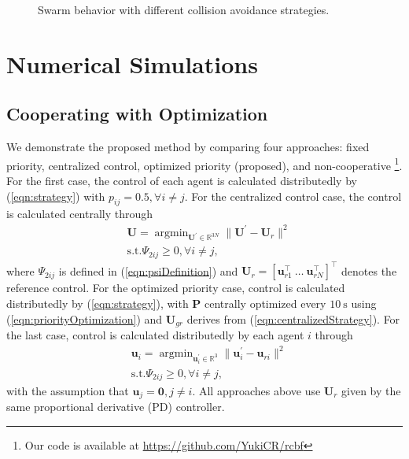 \documentclass{ifacconf}
\begin{document}
\begin{figure}[t!]
   \caption{Swarm behavior with different collision avoidance strategies.}
   \label{fig:optexp}
\end{figure}

\section{Numerical Simulations}\label{sec:exp}

\subsection{Cooperating with Optimization}
\par We demonstrate the proposed method by comparing four approaches: fixed priority, centralized control, optimized priority (proposed), and non-cooperative 
\footnote{Our code is available at \url{https://github.com/YukiCR/rcbf}}.
For the first case, the control of each agent is calculated distributedly by (\ref{eqn:strategy}) with $p_{ij} = 0.5, \forall i \neq j$.
For the centralized control case, the control is calculated centrally through 
\begin{equation}\label{eqn:centralizedStrategy}
\begin{aligned}
      &\boldsymbol{U} = \mathop{\arg \min}_{\boldsymbol{U}^{\prime} \in \mathbb{R}^{3 N}} \| \boldsymbol{U}^\prime - \boldsymbol{U}_r\|^2 \\
      &\mathrm{s.t.}  \Psi_{2ij} \ge 0, \forall i \neq j,
\end{aligned}
\end{equation}
where $\Psi_{2ij}$ is defined in (\ref{eqn:psiDefinition}) and $\boldsymbol{U}_r = [\boldsymbol{u}_{r1}^{\top}~\dots~\boldsymbol{u}_{rN}^{\top}]^\top$ denotes the reference control.
For the optimized priority case, control is calculated distributedly by (\ref{eqn:strategy}), with $\boldsymbol{P}$ centrally optimized every $10~\mathrm{s}$ using (\ref{eqn:priorityOptimization}) and $\boldsymbol{U}_{gr}$ derives from (\ref{eqn:centralizedStrategy}).
For the last case, control is calculated distributedly by each agent $i$ through
\begin{equation}
\begin{aligned}
      & \boldsymbol{u}_i = \mathop{\arg \min}_{\boldsymbol{u}_i^{\prime} \in \mathbb{R}^{3}} \| \boldsymbol{u}_i^\prime - \boldsymbol{u}_{ri}\|^2 \\
      & \mathrm{s.t.}  \Psi_{2ij} \ge 0, \forall i \neq j,
\end{aligned}
\end{equation}
with the assumption that $\boldsymbol{u}_j = \boldsymbol{0}, j \neq i$.  
All approaches above use $\boldsymbol{U}_r$ given by the same proportional derivative (PD) controller.
\end{document}

